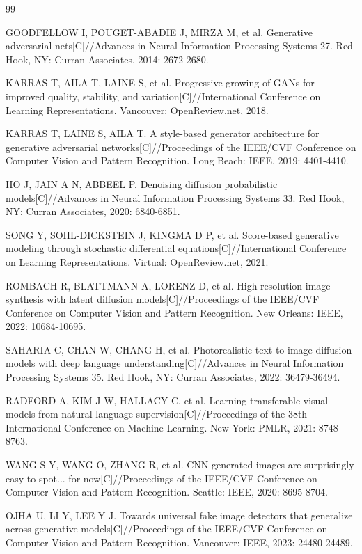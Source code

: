 \begin{thebibliography}{99}
{}

GOODFELLOW I, POUGET-ABADIE J, MIRZA M, et al. Generative adversarial nets[C]//Advances in Neural Information Processing Systems 27. Red Hook, NY: Curran Associates, 2014: 2672-2680.

KARRAS T, AILA T, LAINE S, et al. Progressive growing of GANs for improved quality, stability, and variation[C]//International Conference on Learning Representations. Vancouver: OpenReview.net, 2018.

KARRAS T, LAINE S, AILA T. A style-based generator architecture for generative adversarial networks[C]//Proceedings of the IEEE/CVF Conference on Computer Vision and Pattern Recognition. Long Beach: IEEE, 2019: 4401-4410.

HO J, JAIN A N, ABBEEL P. Denoising diffusion probabilistic models[C]//Advances in Neural Information Processing Systems 33. Red Hook, NY: Curran Associates, 2020: 6840-6851.

SONG Y, SOHL-DICKSTEIN J, KINGMA D P, et al. Score-based generative modeling through stochastic differential equations[C]//International Conference on Learning Representations. Virtual: OpenReview.net, 2021.

ROMBACH R, BLATTMANN A, LORENZ D, et al. High-resolution image synthesis with latent diffusion models[C]//Proceedings of the IEEE/CVF Conference on Computer Vision and Pattern Recognition. New Orleans: IEEE, 2022: 10684-10695.

SAHARIA C, CHAN W, CHANG H, et al. Photorealistic text-to-image diffusion models with deep language understanding[C]//Advances in Neural Information Processing Systems 35. Red Hook, NY: Curran Associates, 2022: 36479-36494.

RADFORD A, KIM J W, HALLACY C, et al. Learning transferable visual models from natural language supervision[C]//Proceedings of the 38th International Conference on Machine Learning. New York: PMLR, 2021: 8748-8763.

WANG S Y, WANG O, ZHANG R, et al. CNN-generated images are surprisingly easy to spot... for now[C]//Proceedings of the IEEE/CVF Conference on Computer Vision and Pattern Recognition. Seattle: IEEE, 2020: 8695-8704.

OJHA U, LI Y, LEE Y J. Towards universal fake image detectors that generalize across generative models[C]//Proceedings of the IEEE/CVF Conference on Computer Vision and Pattern Recognition. Vancouver: IEEE, 2023: 24480-24489.


\end{thebibliography}
